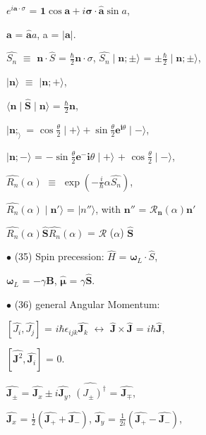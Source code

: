 \documentclass[a4paper, 10pt, onepage]{elegantbook}
\begin{document}
{$e^{i \mathbf a \cdot \sigma}$ = $\mathbf{1} \cos \mathbf a + i {\mathbf \sigma}  \cdot  \hat{\mathbf a} \sin a$,  

$ \mathbf a$ = $\hat{\mathbf a} a$, a = $|\mathbf a|$.  

$\hat{S_n}$ $\equiv$ $\mathbf n \cdot \hat{S}$ = $\frac{\hbar}{2} \mathbf n \cdot \sigma$, $\hat{S_n} \mid \mathbf n; 
\pm \rangle$ =  $\pm \frac{\hbar}{2} \mid \mathbf n; \pm \rangle$, 

$\mid \mathbf n \rangle$ $\equiv$ $\mid \mathbf n ; + \rangle$,  

 $\langle \mathbf n \mid  \hat{\mathbf S} \mid \mathbf n \rangle$ = $\frac{\hbar}{2} \mathbf n$,  

$\mid \mathbf n; _ \rangle$ = $\cos \frac{\theta}{2} \mid + \rangle + \sin \frac{\theta}{2} \mathbf{e}^{\mathbf{i} 
\theta} \mid - \rangle$, 

$\mid \mathbf n; - \rangle$ = $- \sin \frac{\theta}{2} \mathbf{e}^- {\mathbf{i} \theta} \mid + \rangle$ + $\cos 
\frac{\theta}{2} \mid - \rangle$, 

$\hat{R_n} (\alpha)$ $\equiv$ $\exp(- \frac{i}{\hbar} \alpha \hat{S_n})$, 

$\hat{R_n} (\alpha) \mid \mathbf n' \rangle$ = $\mid n'' \rangle$, with $ \mathbf n''$ = $\mathcal{R_\mathbf n} 
(\alpha) \mathbf n'$ 

$\hat{R_n}(\alpha) \hat{\mathbf S} \hat{R_n}(\alpha)$ = ${\mathcal{R}}$ ($\alpha$) $\hat{\mathbf{S}}$ 

$\bullet$ (35) Spin precession: $ \hat{H}$ = $ {\mathbf \omega_L} \cdot \hat{S}$,  

$ {\mathbf \omega_L}$ = $ - \gamma{\mathbf B}$, $ \hat{\mathbf \mu}$ = $ \gamma \hat{\mathbf S}$.  

$\bullet$ (36) general Angular Momentum: 

$ [\hat{J_i}, \hat{J_j}]$ = $i \hbar \epsilon_{ijk} \hat{\mathbf J_k}$ $\longleftrightarrow$ $\hat{\mathbf J} \times 
\hat{\mathbf J}$ = $ i \hbar \hat{\mathbf J}$,  

$[\hat{\mathbf J^2},\hat{\mathbf J_i}] $ = 0.  

$ \hat{\mathbf J_ \pm}$ = $\hat{\mathbf J_x} \pm i \hat{\mathbf J_y}$, $ \hat{(J_ \pm)^\dagger}$ = $\hat{\mathbf 
J_\mp}$, 

$\hat{\mathbf J_x}$ = $\frac{1}{2} (\hat{\mathbf J_+} + \hat{\mathbf J_-})$, $\hat{\mathbf J_y}$ = 
$\frac{1}{2i}(\hat{\mathbf J_+} - \hat{\mathbf J_-})$,  

}
\end{document}
